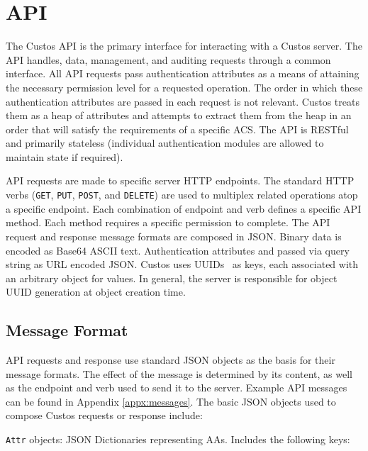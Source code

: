 \section{API}

The Custos API is the primary interface for interacting with a Custos
server. The API handles, data, management, and auditing requests
through a common interface. All API requests pass authentication
attributes as a means of attaining the necessary permission level for
a requested operation. The order in which these authentication
attributes are passed in each request is not relevant. Custos treats
them as a heap of attributes and attempts to extract them from the
heap in an order that will satisfy the requirements of a specific
ACS. The API is RESTful and primarily stateless (individual
authentication modules are allowed to maintain state if required).

API requests are made to specific server HTTP endpoints. The standard
HTTP verbs (\texttt{GET}, \texttt{PUT}, \texttt{POST}, and
\texttt{DELETE}) are used to multiplex related operations atop a
specific endpoint. Each combination of endpoint and verb defines a
specific API method. Each method requires a specific permission to
complete. The API request and response message formats are composed in
JSON. Binary data is encoded as Base64 ASCII text. Authentication
attributes and passed via query string as URL encoded JSON. Custos
uses UUIDs~\cite{Leach2005} as keys, each associated with an arbitrary
object for values. In general, the server is responsible for object
UUID generation at object creation time.

\subsection{Message Format}

API requests and response use standard JSON objects as the basis for
their message formats. The effect of the message is determined by its
content, as well as the endpoint and verb used to send it to the
server. Example API messages can be found in Appendix
\ref{appx:messages}. The basic JSON objects used to compose Custos
requests or response include:

\noindent
\texttt{Attr} objects: JSON Dictionaries representing AAs. Includes
the following keys:

